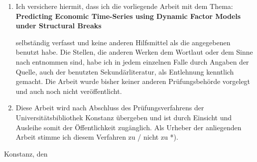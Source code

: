 \documentclass[12pt]{article}
\begin{document}
\raggedright
\begin{enumerate}
\item{ Ich versichere hiermit, dass ich die vorliegende Arbeit mit dem Thema: \\
\vspace{0.5cm}
\textbf{Predicting Economic Time-Series using Dynamic Factor Models under Structural Breaks}

selbständig verfasst und keine anderen Hilfsmittel als die angegebenen benutzt habe.
Die Stellen, die anderen Werken dem Wortlaut oder dem Sinne nach entnommen sind,
habe ich in jedem einzelnen Falle durch Angaben der Quelle, auch der benutzten
Sekundärliteratur, als Entlehnung kenntlich gemacht. Die Arbeit wurde bisher keiner
anderen Prüfungsbehörde vorgelegt und auch noch nicht veröffentlicht.}

\item{Diese Arbeit wird nach Abschluss des Prüfungsverfahrens der Universitätsbibliothek
Konstanz übergeben und ist durch Einsicht und Ausleihe somit der Öffentlichkeit
zugänglich. Als Urheber der anliegenden Arbeit stimme ich diesem Verfahren zu / nicht
zu *).}
\end{enumerate}

\vspace{1cm}
Konstanz, den \underline{\hspace{3.3cm}} \hspace{3cm} \underline{\hspace{6cm}}
\end{document}
